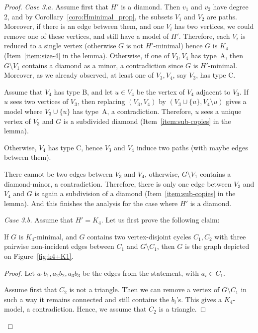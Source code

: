 \documentclass[a4paper,thm-restate,USenglish]{lipics-v2019}
\begin{document}
\begin{proof}
\noindent
\textit{Case 3.a.}
Assume first that $H'$ is a diamond. 
Then $v_1$ and $v_2$ have degree 2, and by Corollary~\ref{coro:Hminimal_prop}, the subsets $V_1$ and $V_2$ are paths. 
Moreover, if there is an edge between them, and one $V_i$ has two vertices, we could remove one of these vertices, and still have a model of $H'$. 
Therefore, each $V_i$ is reduced to a single vertex (otherwise $G$ is not $H'$-minimal) hence $G$ is $K_4$ (Item~\ref{item:size-4} in the lemma).
Otherwise, if one of $V_3,V_4$ has type~A, then $G\setminus V_1$ contains a diamond as a minor, a contradiction since $G$ is $H'$-minimal. Moreover, as we already observed, at least one of $V_3,V_4$, say $V_3$, has type C. 

Assume that $V_4$ has type B, and let $u\in V_4$ be the vertex of $V_4$ adjacent to $V_3$. 
If $u$ sees two vertices of $V_3$, then replacing $(V_3,V_4)$ by $(V_3\cup\{u\},V_4\setminus u)$ gives a model where $V_3\cup\{u\}$ has type~A, a contradiction. Therefore, $u$ sees a unique vertex of $V_3$ and $G$ is a subdivided diamond (Item~\ref{item:sub-copies} in the lemma).

Otherwise, $V_4$ has type C, hence $V_3$ and $V_4$ induce two paths (with maybe edges between them).

There cannot be two edges between $V_3$ and $V_4$, otherwise, $G\setminus V_1$ contains a diamond-minor, a contradiction. Therefore, there is only one edge between $V_3$ and $V_4$ and $G$ is again a subdivision of a diamond (Item~\ref{item:sub-copies} in the lemma). And this finishes the analysis for the case where $H'$ is a diamond.

\smallskip

\noindent
\textit{Case 3.b.}
Assume that $H'=K_4$. Let us first prove the following claim:

\begin{claim}\label{clm:K4+K1}
If $G$ is $K_4$-minimal, and $G$ contains two vertex-disjoint cycles $C_1,C_2$ with three pairwise non-incident edges between $C_1$ and $G\setminus C_1$, then $G$ is the graph depicted on Figure~\ref{fig:k4+K1}.
\end{claim}

\begin{proof}
Let $a_1b_1,a_2b_2,a_3b_3$ be the edges from the statement, with $a_i\in C_1$.

Assume first that $C_2$ is not a triangle. Then we can remove a vertex of $G \setminus C_1$ in such a way it remains connected and still contains the $b_i$'s. This gives a $K_4$-model, a contradiction. Hence, we assume that $C_2$ is a triangle.


\end{proof}
\end{proof}
\end{document}
